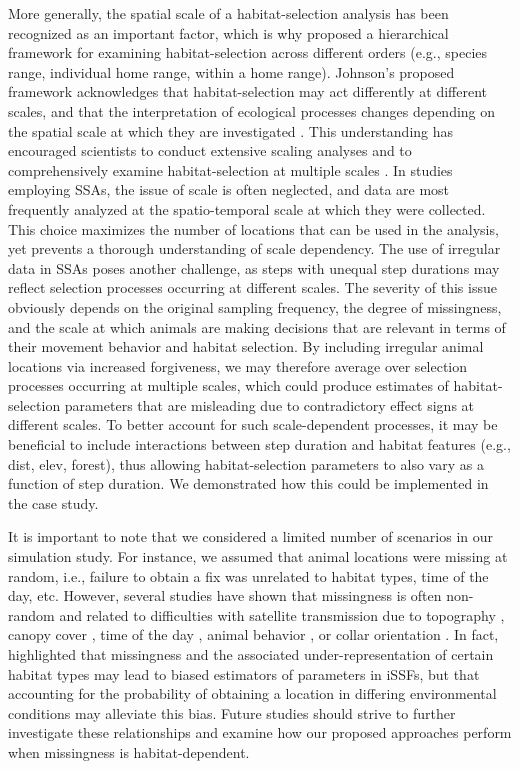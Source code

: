 \documentclass[../FinalThesis.tex]{subfiles}
\begin{document}
More generally, the spatial scale of a habitat-selection analysis has been
recognized as an important factor, which is why \citet{Johnson.1980} proposed a
hierarchical framework for examining habitat-selection across different orders
(e.g., species range, individual home range, within a home range). Johnson's
proposed framework acknowledges that habitat-selection may act differently at
different scales, and that the interpretation of ecological processes changes
depending on the spatial scale at which they are investigated \citep{Wiens.1989,
Levin.1992}. This understanding has encouraged scientists to conduct extensive
scaling analyses and to comprehensively examine habitat-selection at multiple
scales \citep{DeCesare.2012, McGarigal.2016, Pitman.2017, Zeller.2017}. In
studies employing SSAs, the issue of scale is often neglected, and data are most
frequently analyzed at the spatio-temporal scale at which they were collected.
This choice maximizes the number of locations that can be used in the analysis,
yet prevents a thorough understanding of scale dependency. The use of irregular
data in SSAs poses another challenge, as steps with unequal step durations may
reflect selection processes occurring at different scales. The severity of this
issue obviously depends on the original sampling frequency, the degree of
missingness, and the scale at which animals are making decisions that are
relevant in terms of their movement behavior and habitat selection. By including
irregular animal locations via increased forgiveness, we may therefore average
over selection processes occurring at multiple scales, which could produce
estimates of habitat-selection parameters that are misleading due to
contradictory effect signs at different scales. To better account for such
scale-dependent processes, it may be beneficial to include interactions between
step duration and habitat features (e.g., \textsf{dist}, \textsf{elev},
\textsf{forest}), thus allowing habitat-selection parameters to also vary as a
function of step duration. We demonstrated how this could be implemented in the
case study.

It is important to note that we considered a limited number of scenarios in our
simulation study. For instance, we assumed that animal locations were missing at
random, i.e., failure to obtain a fix was unrelated to habitat types, time of
the day, etc. However, several studies have shown that missingness is often
non-random and related to difficulties with satellite transmission due to
topography \citep{Lewis.2007}, canopy cover \citep{Phillips.1998, DeCesare.2005,
Hansen.2008}, time of the day \citep{Graves.2006}, animal behavior
\citep{Mattisson.2010}, or collar orientation \citep{Deon.2005}. In fact,
\citet{Vales.2022} highlighted that missingness and the associated
under-representation of certain habitat types may lead to biased estimators of
parameters in iSSFs, but that accounting for the probability of obtaining a
location in differing environmental conditions may alleviate this bias. Future
studies should strive to further investigate these relationships and examine how
our proposed approaches perform when missingness is habitat-dependent.
\end{document}
